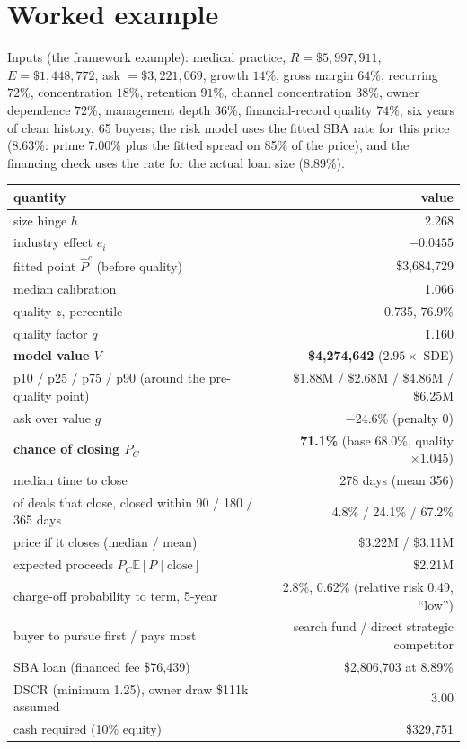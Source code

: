 \documentclass[11pt]{article}
\newcommand{\EV}[1]{\mathbb{E}\!\left[#1\right]}
\begin{document}
\section{Worked example}
Inputs (the framework example): medical practice, $R=\$5{,}997{,}911$, $E=\$1{,}448{,}772$, ask $=\$3{,}221{,}069$, growth $14\%$, gross margin $64\%$, recurring $72\%$, concentration $18\%$, retention $91\%$, channel concentration $38\%$, owner dependence $72\%$, management depth $36\%$, financial-record quality $74\%$, six years of clean history, 65 buyers; the risk model uses the fitted SBA rate for this price (8.63\%: prime $7.00\%$ plus the fitted spread on 85\% of the price), and the financing check uses the rate for the actual loan size (8.89\%).

\begin{center}\small\begin{tabular}{lr}\toprule
quantity & value\\\midrule
size hinge $h$ & 2.268\\
industry effect $e_i$ & $-0.0455$\\
fitted point $\hat P^c$ (before quality) & \$3,684,729\\
median calibration & 1.066\\
quality $z$, percentile & 0.735, 76.9\%\\
quality factor $q$ & 1.160\\
\textbf{model value $V$} & \textbf{\$4,274,642} ($2.95\times$ SDE)\\
p10 / p25 / p75 / p90 (around the pre-quality point) & \$1.88M / \$2.68M / \$4.86M / \$6.25M\\
ask over value $g$ & $-24.6\%$ (penalty 0)\\
\textbf{chance of closing $P_C$} & \textbf{71.1\%} (base 68.0\%, quality $\times1.045$)\\
median time to close & 278 days (mean 356)\\
of deals that close, closed within 90 / 180 / 365 days & 4.8\% / 24.1\% / 67.2\%\\
price if it closes (median / mean) & \$3.22M / \$3.11M\\
expected proceeds $P_C\EV{P\mid\text{close}}$ & \$2.21M\\
charge-off probability to term, 5-year & 2.8\%, 0.62\% (relative risk 0.49, ``low'')\\
buyer to pursue first / pays most & search fund / direct strategic competitor\\
SBA loan (financed fee \$76,439) & \$2,806,703 at 8.89\%\\
DSCR (minimum 1.25), owner draw \$111k assumed & 3.00\\
cash required (10\% equity) & \$329,751\\\bottomrule\end{tabular}\end{center}
\end{document}
